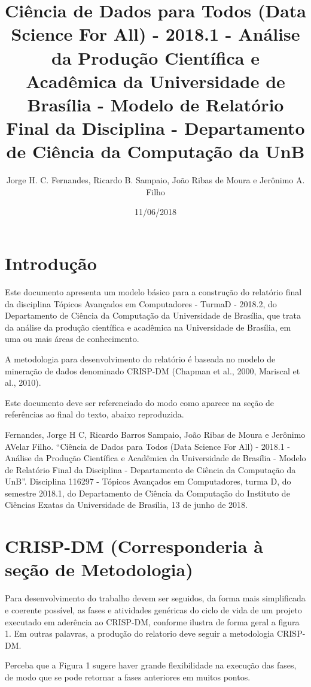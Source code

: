 \documentclass[]{article}
\title{Ciência de Dados para Todos (Data Science For All) - 2018.1 - Análise da
Produção Científica e Acadêmica da Universidade de Brasília - Modelo de
Relatório Final da Disciplina - Departamento de Ciência da Computação da
UnB}
\author{Jorge H. C. Fernandes, Ricardo B. Sampaio, João Ribas de Moura e
Jerônimo A. Filho}
\date{11/06/2018}
\begin{document}
\maketitle

\section{Introdução}\label{introducao}

Este documento apresenta um modelo básico para a construção do relatório
final da disciplina Tópicos Avançados em Computadores - TurmaD - 2018.2,
do Departamento de Ciência da Computação da Universidade de Brasília,
que trata da análise da produção científica e acadêmica na Universidade
de Brasília, em uma ou mais áreas de conhecimento.

A metodologia para desenvolvimento do relatório é baseada no modelo de
mineração de dados denominado CRISP-DM (Chapman et al., 2000, Mariscal
et al., 2010).

Este documento deve ser referenciado do modo como aparece na seção de
referências ao final do texto, abaixo reproduzida.

Fernandes, Jorge H C, Ricardo Barros Sampaio, João Ribas de Moura e
Jerônimo AVelar Filho. ``Ciência de Dados para Todos (Data Science For
All) - 2018.1 - Análise da Produção Científica e Acadêmica da
Universidade de Brasília - Modelo de Relatório Final da Disciplina -
Departamento de Ciência da Computação da UnB''. Disciplina 116297 -
Tópicos Avançados em Computadores, turma D, do semestre 2018.1, do
Departamento de Ciência da Computação do Instituto de Ciências Exatas da
Universidade de Brasília, 13 de junho de 2018.

\section{CRISP-DM (Corresponderia à seção de
Metodologia)}\label{crisp-dm-corresponderia-a-secao-de-metodologia}

Para desenvolvimento do trabalho devem ser seguidos, da forma mais
simplificada e coerente possível, as fases e atividades genéricas do
ciclo de vida de um projeto executado em aderência ao CRISP-DM, conforme
ilustra de forma geral a figura 1. Em outras palavras, a produção do
relatorio deve seguir a metodologia CRISP-DM.

Perceba que a Figura 1 sugere haver grande flexibilidade na execução das
fases, de modo que se pode retornar a fases anteriores em muitos pontos.
\end{document}
